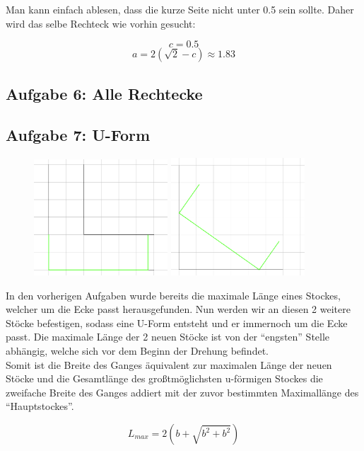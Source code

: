 \documentclass[a4paper,11pt]{article}
\begin{document}
Man kann einfach ablesen, dass die kurze Seite nicht unter 0.5 sein sollte. Daher wird das selbe Rechteck wie vorhin gesucht:

\[ c = 0.5 \]
\[ a = 2(\sqrt{2}-c) \approx 1.83 \]

\subsection{Aufgabe 6: Alle Rechtecke}

\subsection{Aufgabe 7: U-Form}
\begin{figure}[H] 
        \centering
        \includegraphics[width=5cm]{img/A7_1.png}
        \includegraphics[width=5cm]{img/A7_2.png}
\end{figure}
In den vorherigen Aufgaben wurde bereits die maximale Länge eines Stockes, welcher um die Ecke passt herausgefunden. Nun werden wir an diesen 2 weitere Stöcke befestigen, sodass eine U-Form entsteht und er immernoch um die Ecke passt. Die maximale Länge der 2 neuen Stöcke ist von der “engsten” Stelle abhängig, welche sich vor dem Beginn der Drehung befindet.\\

Somit ist die Breite des Ganges äquivalent zur maximalen Länge der neuen Stöcke und die Gesamtlänge des großtmöglichsten u-förmigen Stockes die zweifache Breite des Ganges addiert mit der zuvor bestimmten Maximallänge des “Hauptstockes”.

\[ L_{max} = 2(b+\sqrt{b^2+b^2}) \]
\end{document}
